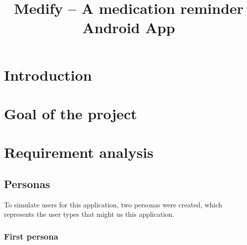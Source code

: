 \documentclass[conference]{IEEEtran}
\begin{document}
\title{Medify -- A medication reminder Android App}

\author{
}

\maketitle

\begin{abstract}
\lipsum[1][1-4] %
\end{abstract}

\section{Introduction}
\lipsum[2][1-10] %

\section{Goal of the project}
\lipsum[3][1-13] %

\section{Requirement analysis}

\subsection{Personas}
To simulate users for this application, two personas were created, which represents the user types
that might us this application.

\subsubsection{First persona} \hfill
\end{document}
